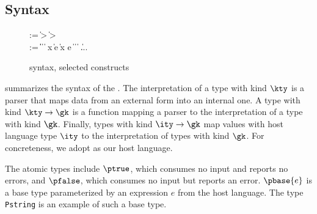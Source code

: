 \subsection{\ddc{} Syntax}
\begin{figure}
{\small
\begin{bnf}
   \meta{\gk} \::= \kty \| \kty \-> \gk
                               \| \ity \-> \gk  \\
   \meta{\ty} \::= 
    \ptrue\| \pfalse \|  \| 
    \plam{\var}{\ity}{\ty} \|  \nlalt
    \psig x \ty \ty \| \psum \ty e \ty \|
    \pset x \ty e \nlalt
    \ptyvar \| \pmu{\ptyvar}{\gk}{\ty} \| 
    \ptylam{\ptyvar}{\kty}{\ty} \| \ptyapp{\ty}{\ty} \| ...
\end{bnf}
}
\caption{\ddc{} syntax, selected constructs}
\label{fig:ddc-syntax}
\end{figure}

 summarizes the syntax of the \ddc.
The interpretation of a type with kind $\kty$ is a parser that maps
data from an external form into an internal one.  
A type with kind $\kty \rightarrow \gk$ is a function mapping 
a parser to the interpretation of a type with kind $\gk$.
Finally, types with kind $\ity \rightarrow \gk$  map values
with host language type $\ity$ to the interpretation of
types with kind $\gk$.  For concreteness, we adopt \fomega{} as our
host language.

The atomic types include $\ptrue$, which consumes no input and reports
no errors,  and $\pfalse$, which consumes no input but reports an
error.   $\pbase{e}$ is a base type parameterized
by an expression $e$ from the host language. 
The \padsml type {\tt Pstring} is an example of such a base type.

